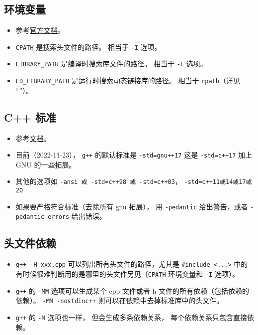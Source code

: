\subsection{环境变量}
\begin{itemize}
\item 参考\href{https://gcc.gnu.org/onlinedocs/gcc/Environment-Variables.html}{官方文档}。
\item \verb`CPATH` 是搜索头文件的路径。 相当于 \verb`-I` 选项。
\item \verb`LIBRARY_PATH` 是编译时搜索库文件的路径。 相当于 \verb`-L` 选项。
\item \verb`LD_LIBRARY_PATH` 是运行时搜索动态链接库的路径。 相当于 \verb`rpath`（详见 “”）。
\end{itemize}

\subsection{C++ 标准}
\begin{itemize}
\item 参考\href{https://gcc.gnu.org/onlinedocs/gcc/Standards.html}{文档}。
\item 目前（2022-11-23）， \verb`g++` 的默认标准是 \verb`-std=gnu++17` 这是 \verb`-std=c++17` 加上 GNU 的一些拓展。
\item 其他的选项如 \verb`-ansi 或 -std=c++98 或 -std=c++03`， \verb`-std=c++11或14或17或20`
\item 如果要严格符合标准（去除所有 gnu 拓展）， 用 \verb`-pedantic` 给出警告，或者 \verb`-pedantic-errors` 给出错误。
\end{itemize}

\subsection{头文件依赖}
\begin{itemize}
\item \verb`g++ -H xxx.cpp` 可以列出所有头文件的路径，尤其是 \verb`#include <...>` 中的有时候很难判断用的是哪里的头文件另见（\verb`CPATH` 环境变量和 \verb`-I` 选项）。
\item \verb`g++` 的 \verb`-MM` 选项可以生成某个 cpp 文件或者 h 文件的所有依赖（包括依赖的依赖）。 \verb`-MM -nostdinc++` 则可以在依赖中去掉标准库中的头文件。
\item \verb`g++` 的 \verb`-M` 选项也一样， 但会生成多条依赖关系， 每个依赖关系只包含直接依赖。
\end{itemize}

